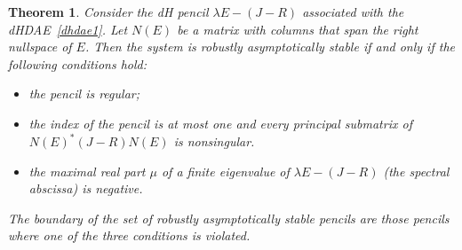 \documentclass[10pt,a4paper]{amsart}
\newtheorem{theorem}{Theorem}
\begin{document}
\begin{theorem}\label{thm:stabledh}
    Consider the  dH
    pencil $\lambda E-(J-R)$ associated with the dHDAE~\eqref{dhdae1}. Let $N(E)$ be a matrix with columns that span the right nullspace of $E$. Then the system is robustly asymptotically stable if and only if the following conditions hold:
    \begin{itemize}
        \item [a)] the pencil is regular;
        \item [b)] the index of the pencil is at most one and every principal submatrix of  $N(E)^*(J-R)N(E)$ is nonsingular.
        \item [c)] the maximal real part $\mu$ of a finite eigenvalue of $\lambda E-(J-R)$ (the spectral abscissa) is negative.
    \end{itemize}
    The boundary of the set of robustly asymptotically stable pencils are those pencils where one of the three conditions is violated.
\end{theorem}
\end{document}
